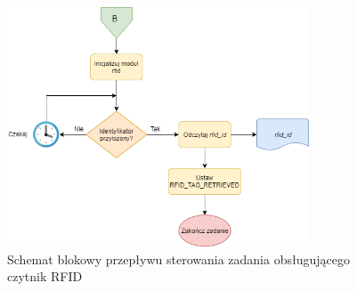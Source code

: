             \begin{figure}[]
                \centering
                \includegraphics[width=0.8\textwidth]{chapters/images/flowchart3.png}
                \caption{Schemat blokowy przepływu sterowania zadania obsługującego czytnik RFID}
                \label{fig:flowchart3}
            \end{figure}